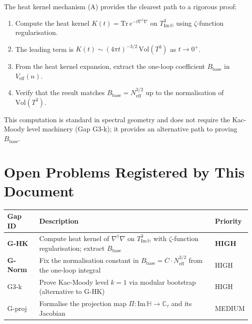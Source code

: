 \documentclass[12pt,a4paper]{article}
\theoremstyle{definition}
\theoremstyle{remark}
\begin{document}
The heat kernel mechanism (A) provides the clearest path to a rigorous proof:

\begin{enumerate}
  \item Compute the heat kernel $K(t) = \mathrm{Tr}\,e^{-t\nabla^\dagger\nabla}$
        on $T^3_{\mathrm{Im}\,\mathbb{H}}$ using $\zeta$-function regularisation.
  \item The leading term is $K(t) \sim (4\pi t)^{-3/2}\,\mathrm{Vol}(T^3)$
        as $t \to 0^+$.
  \item From the heat kernel expansion, extract the one-loop coefficient
        $B_{\mathrm{base}}$ in $V_{\mathrm{eff}}(n)$.
  \item Verify that the result matches $B_{\mathrm{base}} = N_{\mathrm{eff}}^{3/2}$
        up to the normalisation of $\mathrm{Vol}(T^3)$.
\end{enumerate}

This computation is standard in spectral geometry and does not require the
Kac-Moody level machinery (Gap G3-k); it provides an alternative path to
proving $B_{\mathrm{base}}$.

\section{Open Problems Registered by This Document}
\label{sec:exp32:gaps}

\begin{center}
\begin{longtable}{lll}
\toprule
Gap ID & Description & Priority \\
\midrule
\textbf{G-HK} & Compute heat kernel of $\nabla^\dagger\nabla$ on $T^3_{\mathrm{Im}\,\mathbb{H}}$
  with $\zeta$-function regularisation; extract $B_{\mathrm{base}}$ & \textbf{HIGH} \\
\textbf{G-Norm} & Fix the normalisation constant in $B_{\mathrm{base}} = C \cdot N_{\mathrm{eff}}^{3/2}$
  from the one-loop integral & HIGH \\
G3-k & Prove Kac-Moody level $k=1$ via modular bootstrap
  (alternative to G-HK) & HIGH \\
G-proj & Formalise the projection map $\Pi: \mathrm{Im}\,\mathbb{H} \to \mathbb{C}_\tau$
  and its Jacobian & MEDIUM \\
\bottomrule
\end{longtable}
\end{center}

\ifdefined\INCLUDEMODE
\else
\end{document}
